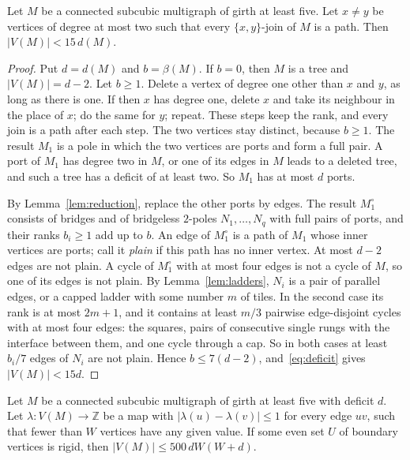 \begin{lemma}\label{lem:fullfive}
Let $M$ be a connected subcubic multigraph of girth at least five. Let $x\ne y$ be vertices of
degree at most two such that every $\{x,y\}$-join of $M$ is a path. Then $|V(M)|<15\,d(M)$.
\end{lemma}

\begin{proof}
Put $d=d(M)$ and $b=\beta(M)$. If $b=0$, then $M$ is a tree and $|V(M)|=d-2$. Let $b\ge1$. Delete
a vertex of degree one other than $x$ and $y$, as long as there is one. If then $x$ has degree
one, delete $x$ and take its neighbour in the place of $x$; do the same for $y$; repeat. These
steps keep the rank, and every join is a path after each step. The two vertices stay distinct,
because $b\ge1$. The result $M_1$ is a pole in which the two vertices are ports and form a full
pair. A port of $M_1$ has degree two in $M$, or one of its edges in $M$ leads to a deleted tree,
and such a tree has a deficit of at least two. So $M_1$ has at most $d$ ports.

By Lemma~\ref{lem:reduction}, replace the other ports by edges. The result $M_1^{\circ}$
consists of bridges and of bridgeless $2$-poles $N_1,\dots,N_q$ with full pairs of ports, and
their ranks $b_i\ge1$ add up to $b$. An edge of $M_1^{\circ}$ is a path of $M_1$ whose inner
vertices are ports; call it \emph{plain} if this path has no inner vertex. At most $d-2$ edges
are not plain. A cycle of $M_1^{\circ}$ with at most four edges is not a cycle of $M$, so one of
its edges is not plain. By Lemma~\ref{lem:ladders}, $N_i$ is a pair of parallel edges, or a capped
ladder with some number $m$ of tiles. In the second case its rank is at most $2m+1$, and it
contains at least $m/3$ pairwise edge-disjoint cycles with at most four edges: the squares, pairs
of consecutive single rungs with the interface between them, and one cycle through a cap. So in
both cases at least $b_i/7$ edges of $N_i$ are not plain. Hence $b\le7(d-2)$,
and~\eqref{eq:deficit} gives $|V(M)|<15d$.
\end{proof}

\begin{lemma}\label{lem:rigidpiece}
Let $M$ be a connected subcubic multigraph of girth at least five with deficit $d$. Let
$\lambda\colon V(M)\to\mathbb Z$ be a map with $|\lambda(u)-\lambda(v)|\le1$ for every edge $uv$,
such that fewer than $W$ vertices have any given value. If some even set $U$ of boundary vertices
is rigid, then $|V(M)|\le500\,dW(W+d)$.
\end{lemma}

